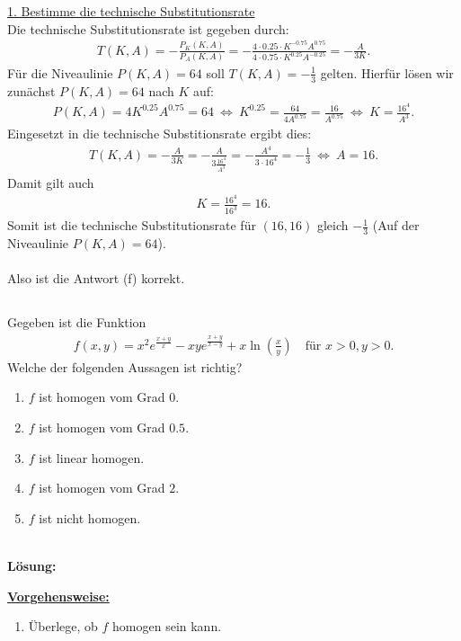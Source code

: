 \underline{1. Bestimme die technische Substitutionsrate}\\
Die technische Substitutionsrate ist gegeben durch:
\begin{align*}
	T(K,A) = - \frac{P_K(K,A)}{P_A(K,A)}
	 = -\frac{4 \cdot 0.25 \cdot K^{-0.75} A^{0.75}}{4 \cdot 0.75 \cdot  K^{0.25} A^{-0.25}} 
	 =
	 -\frac{A}{3 K }. 
\end{align*}
Für die Niveaulinie $ P(K,A) = 64  $ soll $ T(K,A) = -\frac{1}{3} $ gelten. Hierfür lösen wir zunächst $ P(K,A) = 64  $ nach $ K $ auf:
\begin{align*}
	P(K,A )= 4 K^{0.25} A^{0.75} = 64 
	\ \Leftrightarrow \
	K^{0.25} = \frac{64}{4 A^{0.75}}
	= \frac{16}{A^{0.75}}
	\ \Leftrightarrow \
	K = \frac{16^4}{A^3}. 
\end{align*}
Eingesetzt in die technische Substitionsrate ergibt dies:
\begin{align*}
	T(K,A)
	=
	-\frac{A}{3 K }
	=
	- \frac{A}{3 \frac{16^4}{A^3}}
	=
	- \frac{A^4}{3 \cdot 16^4}
	=
	- \frac{1}{3}
	\ \Leftrightarrow \
	A = 16.
\end{align*}
Damit gilt auch 
\begin{align*}
	K = \frac{16^4}{16^3} = 16.
\end{align*}
Somit ist die technische Substitutionsrate für $ (16,16) $ gleich $ - \frac{1}{3} $ (Auf der Niveaulinie $ P(K,A ) = 64 $).\\
\\
Also ist die Antwort (f) korrekt.




\newpage



\subsection*{}
Gegeben ist die Funktion
\begin{align*}
	f(x,y) 
	=
	x^2 e^{\frac{x+y}{x}}
	-
	xy e^{\frac{x+y}{x-y}}
	+
	x \ln \left( \frac{x}{y} \right)
	\quad \textrm{für } x>0,y>0.
\end{align*}
Welche der folgenden Aussagen ist richtig?
\renewcommand{\labelenumi}{(\alph{enumi})}
\begin{enumerate}
	\item
	$ f  $ ist homogen vom Grad $ 0 $.
	\item
	$ f  $ ist homogen vom Grad $ 0.5 $.
	\item
	$ f $ ist linear homogen.	
	\item 
	$ f  $ ist homogen vom Grad $ 2 $.
	\item
	$ f $ ist nicht homogen.
\end{enumerate}
\ \\
\textbf{Lösung:}
\begin{mdframed}
\underline{\textbf{Vorgehensweise:}}
\renewcommand{\labelenumi}{\theenumi.}
\begin{enumerate}
\item Überlege, ob $ f $ homogen sein kann.
\end{enumerate}
\end{mdframed}

